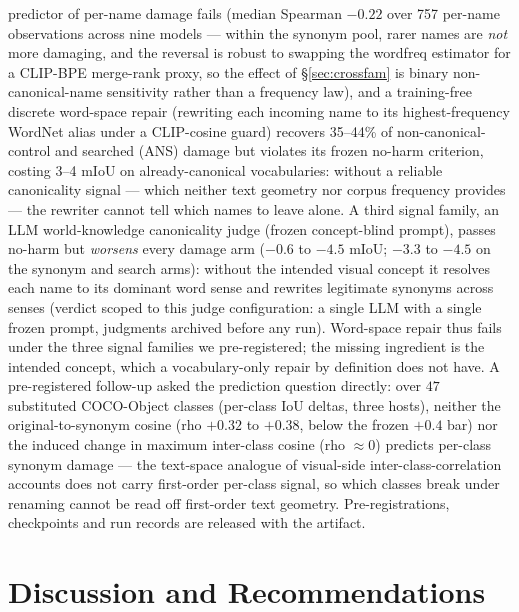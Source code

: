 \documentclass[11pt]{article}
\newcommand{\miou}{mIoU}
\begin{document}
predictor of per-name damage fails (median Spearman $-0.22$ over 757
per-name observations across nine models --- within the synonym pool,
rarer names are \emph{not} more damaging, and the reversal is robust to
swapping the wordfreq estimator for a CLIP-BPE merge-rank proxy, so the
effect of \S\ref{sec:crossfam} is binary non-canonical-name sensitivity
rather than a frequency law), and a training-free discrete word-space repair
(rewriting each incoming name to its highest-frequency WordNet alias
under a CLIP-cosine guard) recovers 35--44\% of non-canonical-control and searched
(ANS) damage but violates its frozen no-harm criterion, costing 3--4
\miou{} on already-canonical vocabularies: without a reliable
canonicality signal --- which neither text geometry nor corpus frequency
provides --- the rewriter cannot tell which names to leave alone. A
third signal family, an LLM world-knowledge canonicality judge (frozen
concept-blind prompt), passes no-harm but \emph{worsens} every damage arm
($-0.6$ to $-4.5$ \miou{}; $-3.3$ to $-4.5$ on the synonym and search arms): without the intended visual concept it
resolves each name to its dominant word sense and rewrites legitimate
synonyms across senses (verdict scoped to this judge configuration: a
single LLM with a single frozen prompt, judgments archived before any
run). Word-space repair thus fails under the three signal families we
pre-registered; the missing ingredient is the intended
concept, which a vocabulary-only repair by definition does not have.
A pre-registered follow-up asked the prediction question directly: over
$47$ substituted COCO-Object classes (per-class IoU deltas, three hosts),
neither the original-to-synonym cosine (rho $+0.32$ to $+0.38$, below the
frozen $+0.4$ bar) nor the induced change in maximum inter-class cosine
(rho $\approx 0$) predicts per-class synonym damage --- the text-space
analogue of visual-side inter-class-correlation accounts does not carry
first-order per-class signal, so which classes break under renaming cannot
be read off first-order text geometry.
Pre-registrations, checkpoints and
run records are released with the artifact.

\section{Discussion and Recommendations}
\end{document}
